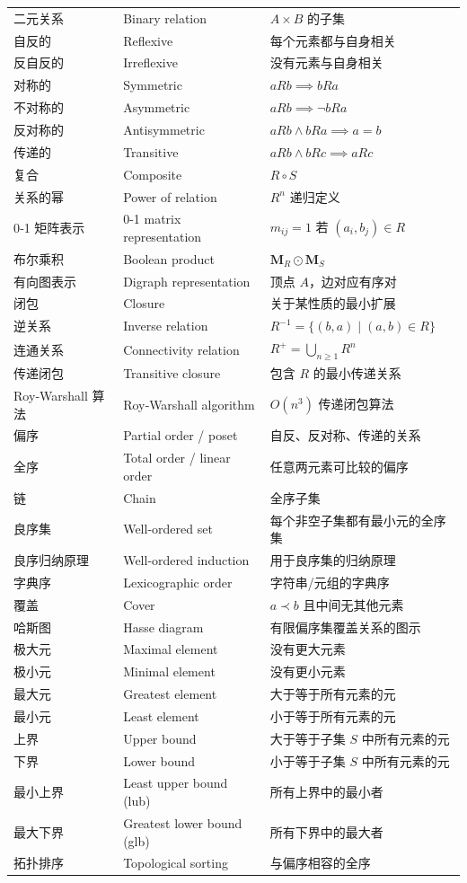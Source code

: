 \documentclass[UTF8,11pt,a4paper]{ctexbook}   %
\theoremstyle{definition}
\begin{document}
\begin{longtable}{|p{4.8cm}|p{4.8cm}|p{4.8cm}|}
二元关系 & Binary relation & $A \times B$ 的子集 \\
自反的 & Reflexive & 每个元素都与自身相关 \\
反自反的 & Irreflexive & 没有元素与自身相关 \\
对称的 & Symmetric & $aRb \implies bRa$ \\
不对称的 & Asymmetric & $aRb \implies \lnot bRa$ \\
反对称的 & Antisymmetric & $aRb \land bRa \implies a=b$ \\
传递的 & Transitive & $aRb \land bRc \implies aRc$ \\
复合 & Composite & $R \circ S$ \\
关系的幂 & Power of relation & $R^n$ 递归定义 \\
0‑1 矩阵表示 & 0-1 matrix representation & $m_{ij}=1$ 若 $(a_i,b_j)\in R$ \\
布尔乘积 & Boolean product & $\mathbf{M}_R \odot \mathbf{M}_S$ \\
有向图表示 & Digraph representation & 顶点 $A$，边对应有序对 \\
闭包 & Closure & 关于某性质的最小扩展 \\
逆关系 & Inverse relation & $R^{-1}=\{(b,a)\mid (a,b)\in R\}$ \\
连通关系 & Connectivity relation & $R^+=\bigcup_{n\ge1}R^n$ \\
传递闭包 & Transitive closure & 包含 $R$ 的最小传递关系 \\
Roy‑Warshall 算法 & Roy‑Warshall algorithm & $O(n^3)$ 传递闭包算法 \\
偏序 & Partial order / poset & 自反、反对称、传递的关系 \\
全序 & Total order / linear order & 任意两元素可比较的偏序 \\
链 & Chain & 全序子集 \\
良序集 & Well-ordered set & 每个非空子集都有最小元的全序集 \\
良序归纳原理 & Well-ordered induction & 用于良序集的归纳原理 \\
字典序 & Lexicographic order & 字符串/元组的字典序 \\
覆盖 & Cover & $a \prec b$ 且中间无其他元素 \\
哈斯图 & Hasse diagram & 有限偏序集覆盖关系的图示 \\
极大元 & Maximal element & 没有更大元素 \\
极小元 & Minimal element & 没有更小元素 \\
最大元 & Greatest element & 大于等于所有元素的元 \\
最小元 & Least element & 小于等于所有元素的元 \\
上界 & Upper bound & 大于等于子集 $S$ 中所有元素的元 \\
下界 & Lower bound & 小于等于子集 $S$ 中所有元素的元 \\
最小上界 & Least upper bound (lub) & 所有上界中的最小者 \\
最大下界 & Greatest lower bound (glb) & 所有下界中的最大者 \\
拓扑排序 & Topological sorting & 与偏序相容的全序 \\
\end{longtable}
\end{document}
